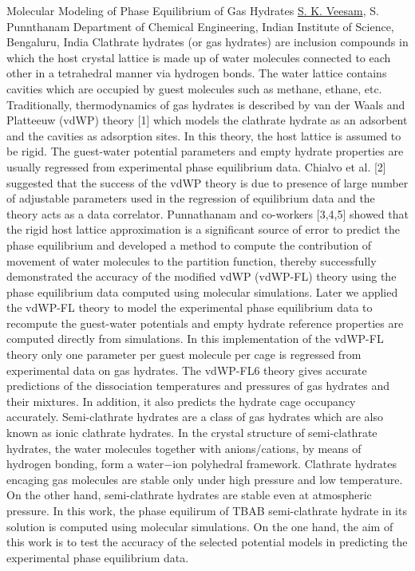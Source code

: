 
    \begin{abstract_online}{Molecular Modeling of Phase Equilibrium of Gas Hydrates}{%
        \underline{S. K. Veesam}, S. Punnthanam}{%
        }{%
        Department of Chemical Engineering, Indian Institute of Science, Bengaluru, India}
    Clathrate hydrates (or gas hydrates) are inclusion compounds in which the host crystal lattice is made up of water molecules connected to each other in a tetrahedral manner via hydrogen bonds. The water lattice contains cavities which are occupied by guest molecules such as methane, ethane, etc. Traditionally, thermodynamics of gas hydrates is described by van der Waals and Platteeuw (vdWP) theory [1] which models the clathrate hydrate as an adsorbent and the cavities as adsorption sites.  In this theory, the host lattice is assumed to be rigid. The guest-water potential parameters and empty hydrate properties are usually regressed from experimental phase equilibrium data. Chialvo et al. [2] suggested that the success of the vdWP theory is due to presence of large number of adjustable parameters used in the regression of equilibrium data and the theory acts as a data correlator. Punnathanam and co-workers [3,4,5] showed that the rigid host lattice approximation is a significant source of error to predict the phase equilibrium and developed a method to compute the contribution of movement of water molecules to the partition function, thereby successfully demonstrated the accuracy of the modified vdWP (vdWP-FL) theory using the phase equilibrium data computed using molecular simulations. Later we applied the vdWP-FL theory to model the experimental phase equilibrium data to recompute the guest-water potentials and empty hydrate reference properties are computed directly from simulations. In this implementation of the vdWP-FL theory only one parameter per guest molecule per cage is regressed from experimental data on gas hydrates. The vdWP-FL6 theory gives accurate predictions of the dissociation temperatures and pressures of gas hydrates and their mixtures. In addition, it also predicts the hydrate cage occupancy accurately.  Semi-clathrate hydrates are a class of gas hydrates which are also known as ionic clathrate hydrates. In the crystal structure of semi-clathrate hydrates, the water molecules together with anions/cations, by means of hydrogen bonding, form a water−ion polyhedral framework. Clathrate hydrates encaging gas molecules are stable only under high pressure and low temperature. On the other hand, semi-clathrate hydrates are stable even at atmospheric pressure. In this work, the phase equilirum of TBAB semi-clathrate hydrate in its solution is computed using molecular simulations. On the one hand, the aim of this work is to test the accuracy of the selected potential models in predicting the experimental phase equilibrium data. 
    

\end{abstract_online}
